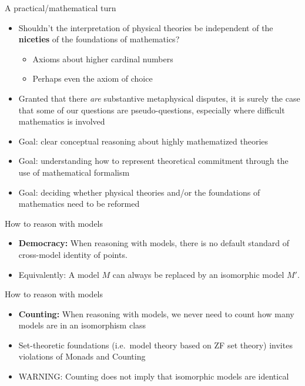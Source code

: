 \documentclass{beamer}
\begin{document}
\begin{frame}{A practical/mathematical turn}

  \begin{itemize}
  \item Shouldn't the interpretation of physical theories be
    independent of the \textbf{niceties} of the foundations of
    mathematics?
  \begin{itemize} \item Axioms about higher cardinal numbers
  \item Perhaps even the axiom of choice  
  \end{itemize}
\item Granted that there \emph{are} substantive metaphysical disputes,
  it is surely the case that some of our questions are
  pseudo-questions, especially where difficult mathematics is involved
\item Goal: clear conceptual reasoning about highly mathematized
  theories
\item Goal: understanding how to represent theoretical commitment
  through the use of mathematical formalism
\item Goal: deciding whether physical theories and/or the foundations
  of mathematics need to be reformed
\end{itemize}


\end{frame}



\begin{frame}{How to reason with models}

  \begin{itemize}
  \item \textbf{Democracy:} When reasoning with models, there is no
    default standard of cross-model identity of points.
  \item Equivalently: A model $M$ can always be replaced by an
    isomorphic model $M'$.
  \end{itemize}  


\end{frame}

\begin{frame}{How to reason with models}

  \begin{itemize}
  \item \textbf{Counting:} When reasoning with models, we never need to count
  how many models are in an isomorphism class
\item Set-theoretic foundations (i.e.\ model theory based on ZF set
  theory) invites violations of Monads and Counting
\item WARNING: Counting does not imply that isomorphic models are identical
\end{itemize}
  
\end{frame}
\end{document}
